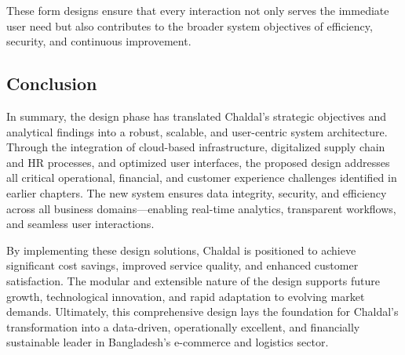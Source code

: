 \documentclass[12pt,a4paper]{article}
\begin{document}
These form designs ensure that every interaction not only serves the immediate user need but also contributes to the broader system objectives of efficiency, security, and continuous improvement.


\subsection{Conclusion}
In summary, the design phase has translated Chaldal’s strategic objectives and analytical findings into a robust, scalable, and user-centric system architecture. Through the integration of cloud-based infrastructure, digitalized supply chain and HR processes, and optimized user interfaces, the proposed design addresses all critical operational, financial, and customer experience challenges identified in earlier chapters. The new system ensures data integrity, security, and efficiency across all business domains—enabling real-time analytics, transparent workflows, and seamless user interactions.

By implementing these design solutions, Chaldal is positioned to achieve significant cost savings, improved service quality, and enhanced customer satisfaction. The modular and extensible nature of the design supports future growth, technological innovation, and rapid adaptation to evolving market demands. Ultimately, this comprehensive design lays the foundation for Chaldal’s transformation into a data-driven, operationally excellent, and financially sustainable leader in Bangladesh’s e-commerce and logistics sector.
\end{document}
